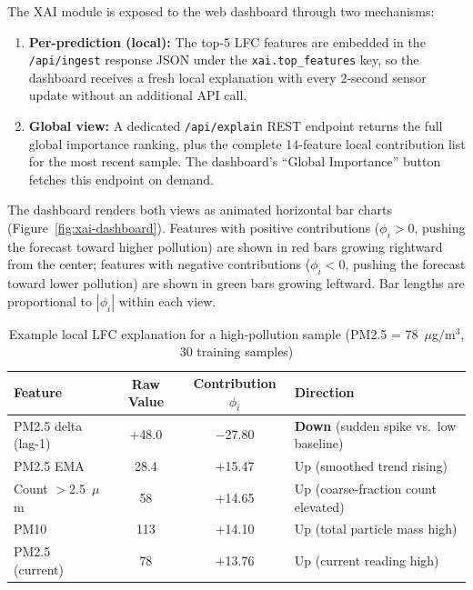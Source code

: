 The XAI module is exposed to the web dashboard through two mechanisms:

\begin{enumerate}
    \item \textbf{Per-prediction (local):} The top-5 LFC features are embedded in the \texttt{/api/ingest} response JSON under the \texttt{xai.top\_features} key, so the dashboard receives a fresh local explanation with every 2-second sensor update without an additional API call.
    \item \textbf{Global view:} A dedicated \texttt{/api/explain} REST endpoint returns the full global importance ranking, plus the complete 14-feature local contribution list for the most recent sample. The dashboard's ``Global Importance'' button fetches this endpoint on demand.
\end{enumerate}

The dashboard renders both views as animated horizontal bar charts (Figure~\ref{fig:xai-dashboard}). Features with positive contributions ($\phi_i > 0$, pushing the forecast toward higher pollution) are shown in red bars growing rightward from the center; features with negative contributions ($\phi_i < 0$, pushing the forecast toward lower pollution) are shown in green bars growing leftward. Bar lengths are proportional to $|\phi_i|$ within each view.

\begin{table}[htbp]
\centering
\caption{Example local LFC explanation for a high-pollution sample (PM2.5 = 78~$\mu$g/m$^3$, 30 training samples)}
\label{tab:xai-example}
\small
\begin{tabular}{@{}lccl@{}}
\toprule
\textbf{Feature} & \textbf{Raw Value} & \textbf{Contribution $\phi_i$} & \textbf{Direction} \\
\midrule
PM2.5 delta (lag-1) & $+$48.0 & $-$27.80 & \textbf{Down} (sudden spike vs.\ low baseline) \\
PM2.5 EMA           & 28.4    & $+$15.47 & Up   (smoothed trend rising) \\
Count $>$2.5~$\mu$m & 58      & $+$14.65 & Up   (coarse-fraction count elevated) \\
PM10                & 113     & $+$14.10 & Up   (total particle mass high) \\
PM2.5 (current)     & 78      & $+$13.76 & Up   (current reading high) \\
\bottomrule
\end{tabular}
\end{table}

